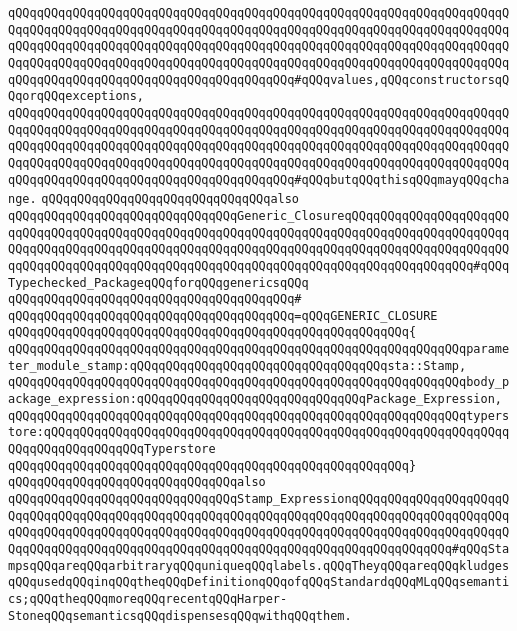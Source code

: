 \verb|qQQqqQQqqQQqqQQqqQQqqQQqqQQqqQQqqQQqqQQqqQQqqQQqqQQqqQQqqQQqqQQqqQQqqQQqqQQqqQQqqQQqqQQqqQQqqQQqqQQqqQQqqQQqqQQqqQQqqQQqqQQqqQQqqQQqqQQqqQQqqQQqqQQqqQQqqQQqqQQqqQQqqQQqqQQqqQQqqQQqqQQqqQQqqQQqqQQqqQQqqQQqqQQqqQQqqQQqqQQqqQQqqQQqqQQqqQQqqQQqqQQqqQQqqQQqqQQqqQQqqQQqqQQqqQQqqQQqqQQqqQQqqQQqqQQqqQQqqQQqqQQqqQQqqQQqqQQqqQQq#qQQqvalues,qQQqconstructorsqQQqorqQQqexceptions,|\newline
\verb|qQQqqQQqqQQqqQQqqQQqqQQqqQQqqQQqqQQqqQQqqQQqqQQqqQQqqQQqqQQqqQQqqQQqqQQqqQQqqQQqqQQqqQQqqQQqqQQqqQQqqQQqqQQqqQQqqQQqqQQqqQQqqQQqqQQqqQQqqQQqqQQqqQQqqQQqqQQqqQQqqQQqqQQqqQQqqQQqqQQqqQQqqQQqqQQqqQQqqQQqqQQqqQQqqQQqqQQqqQQqqQQqqQQqqQQqqQQqqQQqqQQqqQQqqQQqqQQqqQQqqQQqqQQqqQQqqQQqqQQqqQQqqQQqqQQqqQQqqQQqqQQqqQQqqQQqqQQqqQQq#qQQqbutqQQqthisqQQqmayqQQqchange.|\newline
\newline
\verb|qQQqqQQqqQQqqQQqqQQqqQQqqQQqqQQqalso|\newline
\verb|qQQqqQQqqQQqqQQqqQQqqQQqqQQqqQQqGeneric_ClosureqQQqqQQqqQQqqQQqqQQqqQQqqQQqqQQqqQQqqQQqqQQqqQQqqQQqqQQqqQQqqQQqqQQqqQQqqQQqqQQqqQQqqQQqqQQqqQQqqQQqqQQqqQQqqQQqqQQqqQQqqQQqqQQqqQQqqQQqqQQqqQQqqQQqqQQqqQQqqQQqqQQqqQQqqQQqqQQqqQQqqQQqqQQqqQQqqQQqqQQqqQQqqQQqqQQqqQQqqQQqqQQqqQQq#qQQqTypechecked_PackageqQQqforqQQqgenericsqQQq|\newline
\verb|qQQqqQQqqQQqqQQqqQQqqQQqqQQqqQQqqQQqqQQq#|\newline
\verb|qQQqqQQqqQQqqQQqqQQqqQQqqQQqqQQqqQQqqQQq=qQQqGENERIC_CLOSURE|\newline
\verb|qQQqqQQqqQQqqQQqqQQqqQQqqQQqqQQqqQQqqQQqqQQqqQQqqQQqqQQq{|\newline
\verb|qQQqqQQqqQQqqQQqqQQqqQQqqQQqqQQqqQQqqQQqqQQqqQQqqQQqqQQqqQQqqQQqparameter_module_stamp:qQQqqQQqqQQqqQQqqQQqqQQqqQQqqQQqqQQqsta::Stamp,|\newline
\verb|qQQqqQQqqQQqqQQqqQQqqQQqqQQqqQQqqQQqqQQqqQQqqQQqqQQqqQQqqQQqqQQqbody_package_expression:qQQqqQQqqQQqqQQqqQQqqQQqqQQqqQQqPackage_Expression,|\newline
\verb|qQQqqQQqqQQqqQQqqQQqqQQqqQQqqQQqqQQqqQQqqQQqqQQqqQQqqQQqqQQqqQQqtyperstore:qQQqqQQqqQQqqQQqqQQqqQQqqQQqqQQqqQQqqQQqqQQqqQQqqQQqqQQqqQQqqQQqqQQqqQQqqQQqqQQqqQQqTyperstore|\newline
\verb|qQQqqQQqqQQqqQQqqQQqqQQqqQQqqQQqqQQqqQQqqQQqqQQqqQQqqQQq}|\newline
\newline
\verb|qQQqqQQqqQQqqQQqqQQqqQQqqQQqqQQqalso|\newline
\verb|qQQqqQQqqQQqqQQqqQQqqQQqqQQqqQQqStamp_ExpressionqQQqqQQqqQQqqQQqqQQqqQQqqQQqqQQqqQQqqQQqqQQqqQQqqQQqqQQqqQQqqQQqqQQqqQQqqQQqqQQqqQQqqQQqqQQqqQQqqQQqqQQqqQQqqQQqqQQqqQQqqQQqqQQqqQQqqQQqqQQqqQQqqQQqqQQqqQQqqQQqqQQqqQQqqQQqqQQqqQQqqQQqqQQqqQQqqQQqqQQqqQQqqQQqqQQqqQQqqQQqqQQq#qQQqStampsqQQqareqQQqarbitraryqQQquniqueqQQqlabels.qQQqTheyqQQqareqQQqkludgesqQQqusedqQQqinqQQqtheqQQqDefinitionqQQqofqQQqStandardqQQqMLqQQqsemantics;qQQqtheqQQqmoreqQQqrecentqQQqHarper-StoneqQQqsemanticsqQQqdispensesqQQqwithqQQqthem.|\newline

